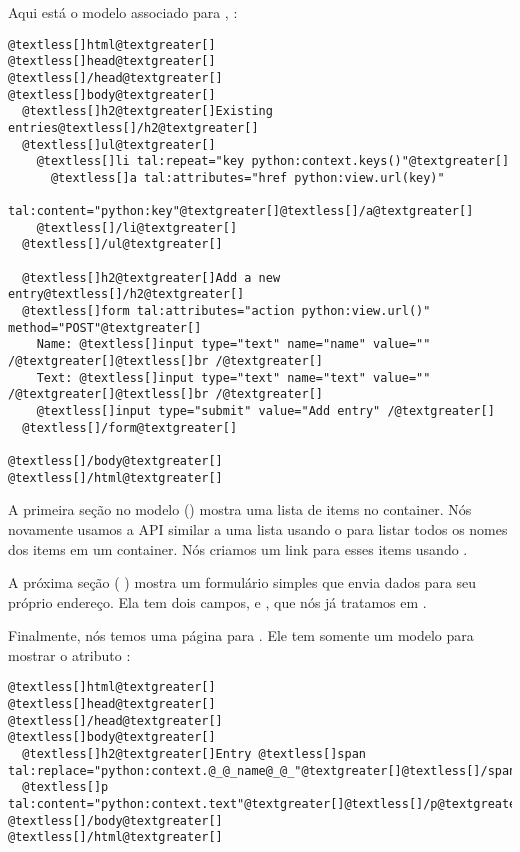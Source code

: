\documentclass[a4paper,12pt,portuguese]{manual}
\begin{document}
Aqui está o modelo associado para , :

\begin{Verbatim}[commandchars=@\[\]]
@textless[]html@textgreater[]
@textless[]head@textgreater[]
@textless[]/head@textgreater[]
@textless[]body@textgreater[]
  @textless[]h2@textgreater[]Existing entries@textless[]/h2@textgreater[]
  @textless[]ul@textgreater[]
    @textless[]li tal:repeat="key python:context.keys()"@textgreater[]
      @textless[]a tal:attributes="href python:view.url(key)" 
         tal:content="python:key"@textgreater[]@textless[]/a@textgreater[]
    @textless[]/li@textgreater[]
  @textless[]/ul@textgreater[]
 
  @textless[]h2@textgreater[]Add a new entry@textless[]/h2@textgreater[]
  @textless[]form tal:attributes="action python:view.url()" method="POST"@textgreater[]
    Name: @textless[]input type="text" name="name" value="" /@textgreater[]@textless[]br /@textgreater[]
    Text: @textless[]input type="text" name="text" value="" /@textgreater[]@textless[]br /@textgreater[]
    @textless[]input type="submit" value="Add entry" /@textgreater[]
  @textless[]/form@textgreater[]

@textless[]/body@textgreater[]
@textless[]/html@textgreater[]
\end{Verbatim}

A primeira seção no modelo () mostra uma
lista de items no container. Nós novamente usamos a API similar a uma
lista usando o  para listar todos os nomes dos items em um
container. Nós criamos um link para esses items usando .

A próxima seção (  ) mostra um formulário
simples que envia dados para seu próprio endereço. Ela tem dois campos, 
e , que nós já tratamos em .

Finalmente, nós temos uma página  para . Ele tem
somente um modelo para mostrar o atributo :

\begin{Verbatim}[commandchars=@\[\]]
@textless[]html@textgreater[]
@textless[]head@textgreater[]
@textless[]/head@textgreater[]
@textless[]body@textgreater[]
  @textless[]h2@textgreater[]Entry @textless[]span tal:replace="python:context.@_@_name@_@_"@textgreater[]@textless[]/span@textgreater[]@textless[]/h2@textgreater[]
  @textless[]p tal:content="python:context.text"@textgreater[]@textless[]/p@textgreater[]
@textless[]/body@textgreater[]
@textless[]/html@textgreater[]
\end{Verbatim}
\end{document}
